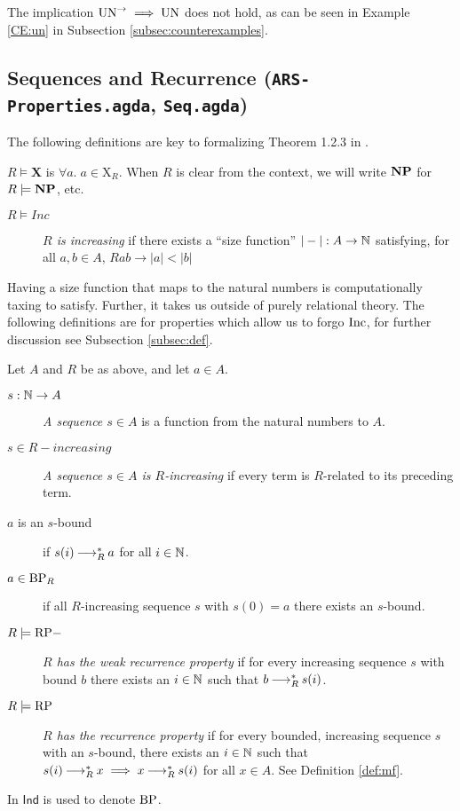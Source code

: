The implication $\mathrm{UN}^{\to} \implies \mathrm{UN}$ does not hold, as can be seen in Example \ref{CE:un} in Subsection \ref{subsec:counterexamples}.

\subsection{Sequences and Recurrence (\texttt{ARS-Properties.agda}, \texttt{Seq.agda})}
The following definitions are key to formalizing Theorem 1.2.3 in \terese.

\begin{notation}
    $R \models \mathbf{X}$ is $\forall a.\; a \in \mathrm{X}_R$. When $R$ is clear from the context, we will write $\mathbf{NP}$ for $R \models \mathbf{NP}$, etc. 
\end{notation}

\begin{definition} \hfill
    \begin{description}
        \item[$R \models Inc$] \emph{$R$ is increasing} if there exists a ``size function'' $|-| : A \to \mathbb{N}$ satisfying, for all $a, b \in A$,
        $Rab \to |a| < |b|$  
    \end{description}
\end{definition}

Having a size function that maps to the natural numbers is computationally taxing to satisfy. 
Further, it takes us outside of purely relational theory. The following definitions are for properties which allow us to forgo $\mathrm{Inc}$, for further discussion see Subsection \ref{subsec:def}.
\begin{definition} \label{def:rp} Let $A$ and $R$ be as above, and let $a \in A$.
    \begin{description} 
        \item[$s : \mathbb{N} \to A$] \emph{A sequence $s \in A$} is a function from the natural numbers to $A$.  
        \item[$s \in R-increasing$] \emph{A sequence $s \in A$ is $R$-increasing} if every term is $R$-related to its preceding term.
        \item[$a$ is an $s$-bound] if $s (i) \mathbin{\longrightarrow_R^*} a$ for all $i \in \mathbb{N}$. 
        \item[$a \in \mathrm{BP}_R$] if all $R$-increasing sequence $s$ with $s (0) = a$ there exists an $s$-bound.  
        \item[$R \models \mathrm{RP-}$] \emph{$R$ has the weak recurrence property} if for every increasing sequence $s$ with bound $b$ there exists an $i \in \mathbb{N}$ such that $b \mathbin{\longrightarrow_R^*} s (i)$.
        \item[$R \models \mathrm{RP}$] \emph{$R$ has the recurrence property} if for every bounded, increasing sequence $s$ with an $s$-bound, there exists an $i \in \mathbb{N}$ such that 
        $s (i) \mathbin{\longrightarrow_R^*} x \implies x \mathbin{\longrightarrow_R^*} s (i)$ for all $x\in A$. See Definition \ref{def:mf}. 
    \end{description}
\end{definition}
In \terese $\mathsf{Ind}$ is used to denote $\mathrm{BP}$. 

